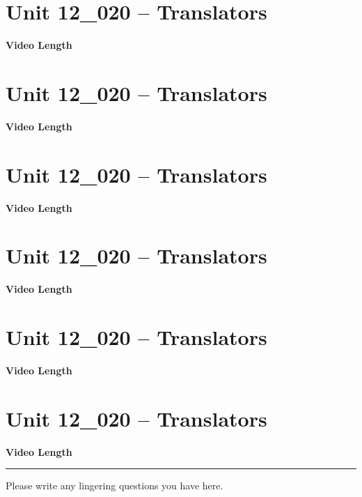 \documentclass[letterpaper,12pt]{exam}
\newcommand{\unit}{Unit 12}
\begin{document}
\begin{questions}
\section*{\unit\_020 -- Translators} 
\par{\selectfont\textbf{Video Length }}

\section*{\unit\_020 -- Translators} 
\par{\selectfont\textbf{Video Length }}

\section*{\unit\_020 -- Translators} 
\par{\selectfont\textbf{Video Length }}

\section*{\unit\_020 -- Translators} 
\par{\selectfont\textbf{Video Length }}

\section*{\unit\_020 -- Translators} 
\par{\selectfont\textbf{Video Length }}

\section*{\unit\_020 -- Translators} 
\par{\selectfont\textbf{Video Length }}


\begin{center}
    \rule{0.5\textwidth}{.4pt}
\end{center}
Please write any lingering questions you have here.
\end{questions}
\end{document}
